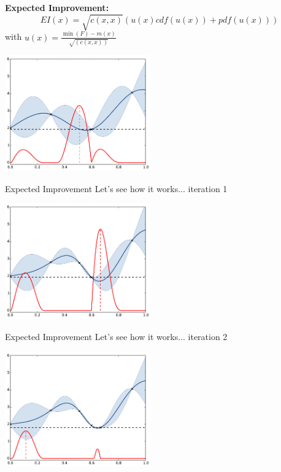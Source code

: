 \begin{frame}{}
\textbf{Expected Improvement:}
$$EI(x) = \sqrt{c(x,x)} (u(x) cdf(u(x)) + pdf(u(x)))$$
\qquad with $ \displaystyle u(x) = \frac{\min(F) - m(x)}{\sqrt{(c(x,x))}}$
\begin{center}
\includegraphics[height=5cm]{4_optimization/figures/python/ego_EI0}
\end{center}
\end{frame}

\begin{frame}{Expected Improvement}
Let's see how it works... iteration 1
\begin{center}
\includegraphics[height=5cm]{4_optimization/figures/python/ego_EI1}
\end{center}
\end{frame}

\begin{frame}[noframenumbering]{Expected Improvement}
Let's see how it works... iteration 2
\begin{center}
\includegraphics[height=5cm]{4_optimization/figures/python/ego_EI2}
\end{center}
\end{frame}

